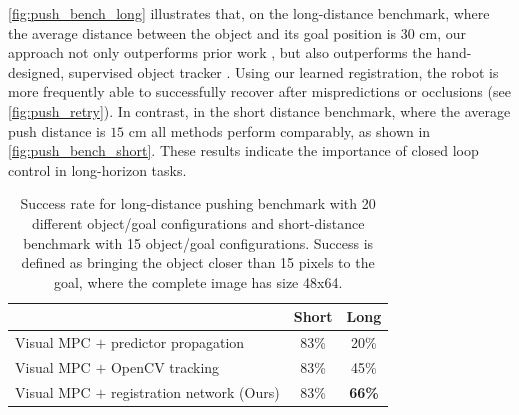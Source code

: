 \autoref{fig:push_bench_long} illustrates that, on the long-distance benchmark, where the average distance between the object and its goal position is $30$ cm,
our approach not only outperforms prior work \cite{sna}, but also outperforms the hand-designed, supervised object tracker \cite{babenko2009visual}. Using our learned registration, the robot is more frequently able to successfully recover after mispredictions or occlusions (see \autoref{fig:push_retry}). In contrast, in the short distance benchmark, where the average push distance is $15$ cm
all methods perform comparably, as shown in \autoref{fig:push_bench_short}. These results indicate the importance of closed loop control in long-horizon tasks.

\begin{table}
	{\footnotesize
		\begin{center}
			\begin{tabular}{lcc}
				\toprule
				& Short & Long \\
				\midrule
			   Visual MPC $+$ predictor propagation  & 83\% & 20\% \\
  			   Visual MPC $+$ OpenCV tracking  & 83\%  & 45\% \\
			   Visual MPC $+$ registration network (Ours)  & 83\% & \textbf{66\%}  \\
				\bottomrule
			\end{tabular}
		\end{center}
	}
	\caption{\footnotesize Success rate for long-distance pushing benchmark with 20 different object/goal configurations and short-distance benchmark with 15 object/goal configurations. Success is defined as bringing the object closer than 15 pixels to the goal, where the complete image has size 48x64.}
	\label{table:res_longd}
	\vspace{-0.35in}
\end{table}



